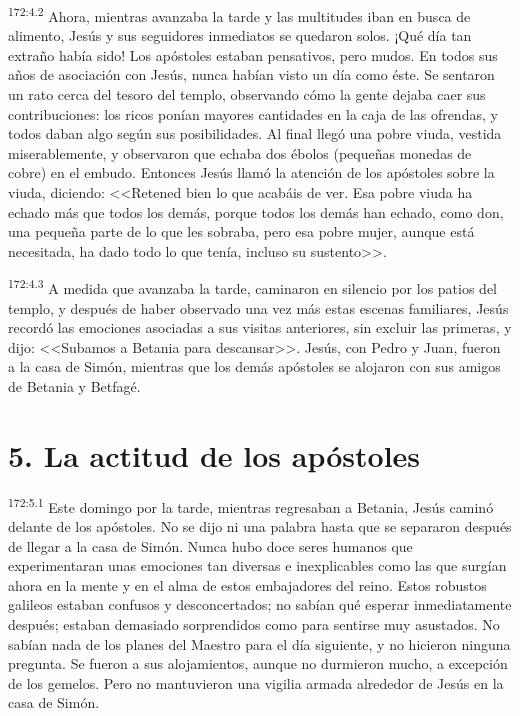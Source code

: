 \par 
\textsuperscript{172:4.2} Ahora, mientras avanzaba la tarde y las multitudes iban en busca de alimento, Jesús y sus seguidores inmediatos se quedaron solos. ¡Qué día tan extraño había sido! Los apóstoles estaban pensativos, pero mudos. En todos sus años de asociación con Jesús, nunca habían visto un día como éste. Se sentaron un rato cerca del tesoro del templo, observando cómo la gente dejaba caer sus contribuciones: los ricos ponían mayores cantidades en la caja de las ofrendas, y todos daban algo según sus posibilidades. Al final llegó una pobre viuda, vestida miserablemente, y observaron que echaba dos ébolos
(pequeñas monedas de cobre) en el embudo. Entonces Jesús llamó la atención de los apóstoles sobre la viuda, diciendo: <<Retened bien lo que acabáis de ver. Esa pobre viuda ha echado más que todos los demás, porque todos los demás han echado, como don, una pequeña parte de lo que les sobraba, pero esa pobre mujer, aunque está necesitada, ha dado todo lo que tenía, incluso su sustento>>.

\par 
\textsuperscript{172:4.3} A medida que avanzaba la tarde, caminaron en silencio por los patios del templo, y después de haber observado una vez más estas escenas familiares, Jesús recordó las emociones asociadas a sus visitas anteriores, sin excluir las primeras, y dijo: <<Subamos a Betania para descansar>>. Jesús, con Pedro y Juan, fueron a la casa de Simón, mientras que los demás apóstoles se alojaron con sus amigos de Betania y Betfagé.

\section*{5. La actitud de los apóstoles}
\par 
\textsuperscript{172:5.1} Este domingo por la tarde, mientras regresaban a Betania, Jesús caminó delante de los apóstoles. No se dijo ni una palabra hasta que se separaron después de llegar a la casa de Simón. Nunca hubo doce seres humanos que experimentaran unas emociones tan diversas e inexplicables como las que surgían ahora en la mente y en el alma de estos embajadores del reino. Estos robustos galileos estaban confusos y desconcertados; no sabían qué esperar inmediatamente después; estaban demasiado sorprendidos como para sentirse muy asustados. No sabían nada de los planes del Maestro para el día siguiente, y no hicieron ninguna pregunta. Se fueron a sus alojamientos, aunque no durmieron mucho, a excepción de los gemelos. Pero no mantuvieron una vigilia armada alrededor de Jesús en la casa de Simón.

